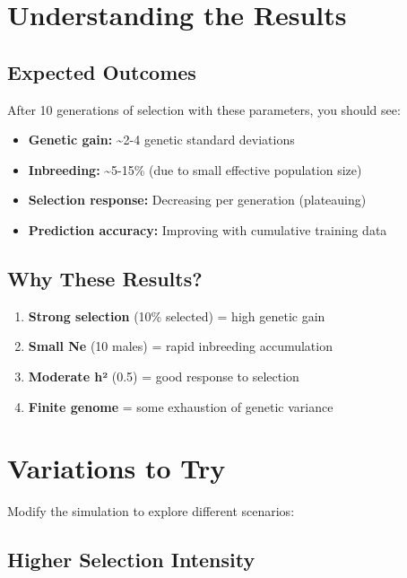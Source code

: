 \documentclass[
  letterpaper,
]{book}
\providecommand{\tightlist}{%
  \setlength{\itemsep}{0pt}\setlength{\parskip}{0pt}}
\begin{document}
\section{Understanding the Results}\label{understanding-the-results}

\subsection{Expected Outcomes}\label{expected-outcomes}

After 10 generations of selection with these parameters, you should see:

\begin{itemize}
\tightlist
\item
  \textbf{Genetic gain:} \textasciitilde2-4 genetic standard deviations
\item
  \textbf{Inbreeding:} \textasciitilde5-15\% (due to small effective
  population size)
\item
  \textbf{Selection response:} Decreasing per generation (plateauing)
\item
  \textbf{Prediction accuracy:} Improving with cumulative training data
\end{itemize}

\subsection{Why These Results?}\label{why-these-results}

\begin{enumerate}
\def\labelenumi{\arabic{enumi}.}
\tightlist
\item
  \textbf{Strong selection} (10\% selected) = high genetic gain
\item
  \textbf{Small Ne} (10 males) = rapid inbreeding accumulation
\item
  \textbf{Moderate h²} (0.5) = good response to selection
\item
  \textbf{Finite genome} = some exhaustion of genetic variance
\end{enumerate}

\section{Variations to Try}\label{variations-to-try}

Modify the simulation to explore different scenarios:

\subsection{Higher Selection
Intensity}\label{higher-selection-intensity}
\end{document}

